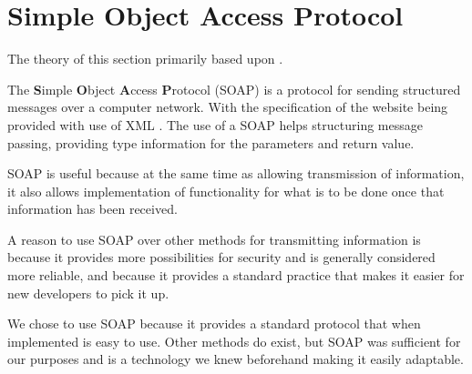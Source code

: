 \section{Simple Object Access Protocol}
The theory of this section primarily based upon \citep{misc:understandingsoapandrest, misc:restsoapwhen}.

The \textbf{S}imple \textbf{O}bject \textbf{A}ccess \textbf{P}rotocol (SOAP) is a protocol for sending structured messages over a computer network.
With the specification of the website being provided with use of XML \citep{misc:soapintro}.
The use of a SOAP helps structuring message passing, providing type information for the parameters and return value. 

SOAP is useful because at the same time as allowing transmission of information, it also allows implementation of functionality for what is to be done once that information has been received.

A reason to use SOAP over other methods for transmitting information is because it provides more possibilities for security and is generally considered more reliable, and because it provides a standard practice that makes it easier for new developers to pick it up. 

We chose to use SOAP because it provides a standard protocol that when implemented is easy to use.
Other methods do exist, but SOAP was sufficient for our purposes and is a technology we knew beforehand making it easily adaptable.